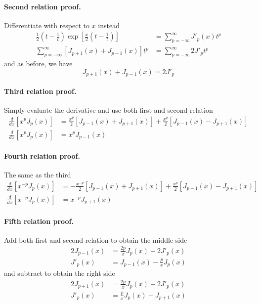 \documentclass[../../../main.tex]{subfiles}
\begin{document}
\paragraph*{Second relation proof.} Differentiate with respect to $x$ instead
\begin{align*}
    \frac{1}{2}\left(t-\frac{1}{t}\right)\exp\left[\frac{x}{2}\left(t-\frac{1}{t}\right)\right] & =\sum_{p=-\infty}^{\infty}J'_p(x)t^{p} \\
    \sum_{p=-\infty}^{\infty}\left[J_{p+1}(x)+J_{p-1}(x)\right]t^p                              & = \sum_{p=-\infty}^{\infty}2J'_pt^{p}
\end{align*}
and as before, we have
\begin{equation*}
    J_{p+1}(x)+J_{p-1}(x)=2J'_p
\end{equation*}

\paragraph*{Third relation proof.} Simply evaluate the derivative and use both first and second relation
\begin{align*}
    \frac{d}{dx}\left[x^pJ_p(x)\right] & = \frac{x^p}{2}\left[J_{p-1}(x)+J_{p+1}(x)\right]+\frac{x^p}{2}\left[J_{p-1}(x)-J_{p+1}(x)\right] \\
    \frac{d}{dx}\left[x^pJ_p(x)\right] & =x^pJ_{p-1}(x)
\end{align*}

\paragraph*{Fourth relation proof.} The same as the third
\begin{align*}
    \frac{d}{dx}\left[x^{-p}J_p(x)\right] & = -\frac{x^{-p}}{2}\left[J_{p-1}(x)+J_{p+1}(x)\right]+\frac{x^p}{2}\left[J_{p-1}(x)-J_{p+1}(x)\right] \\
    \frac{d}{dx}\left[x^{-p}J_p(x)\right] & =x^{-p}J_{p+1}(x)
\end{align*}

\paragraph*{Fifth relation proof.} Add both first and second relation to obtain the middle side
\begin{align*}
    2J_{p-1}(x) & =\frac{2p}{x}J_p(x)+2J'_p(x)  \\
    J'_{p}(x)   & =J_{p-1}(x)-\frac{p}{x}J_p(x)
\end{align*}
and subtract to obtain the right side
\begin{align*}
    2J_{p+1}(x) & =\frac{2p}{x}J_p(x)-2J'_p(x)  \\
    J'_{p}(x)   & =\frac{p}{x}J_p(x)-J_{p+1}(x)
\end{align*}
\end{document}
